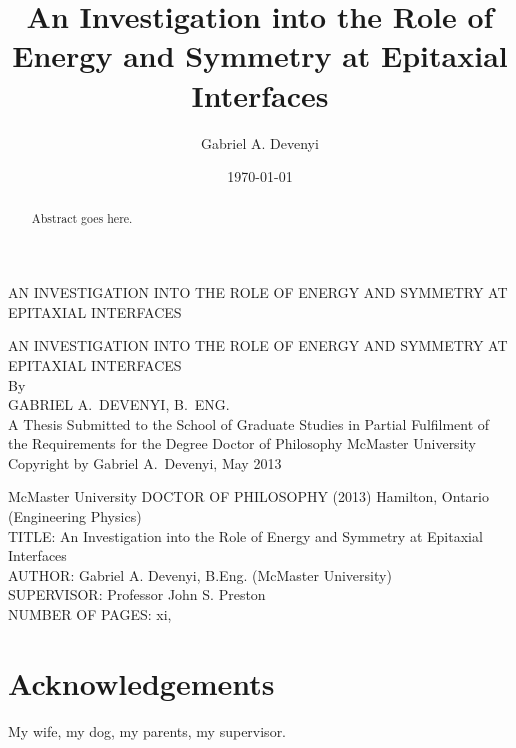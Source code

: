 \documentclass[letterpaper,12pt,twoside]{report}
\title{An Investigation into the Role of Energy and Symmetry at Epitaxial Interfaces}
\author{Gabriel A. Devenyi}
\date{\today}
\begin{document}
\begin{titlepage} %
	\vspace*{\fill}
    \begin{center}{\Large
	\uppercase{An Investigation into the Role of Energy and Symmetry at Epitaxial Interfaces}}
    \end{center}
	\vspace*{\fill}
    \setcounter{page}{0}
\end{titlepage}
\begin{titlepage} %
\centering
\vspace*{\fill} %
{\Large \uppercase{An Investigation into the Role of Energy and Symmetry at Epitaxial Interfaces}\\
By\\GABRIEL A.\ DEVENYI, B.\ ENG.\\}
\vfill
A Thesis Submitted to the School of Graduate Studies in Partial Fulfilment of 
the Requirements for the Degree Doctor of Philosophy
McMaster University
\vfill%
\textcopyright{} Copyright by Gabriel A.\ Devenyi, May 2013
\end{titlepage}
{\noindent McMaster University DOCTOR OF PHILOSOPHY (2013) Hamilton, Ontario (Engineering Physics)\\ 
TITLE: An Investigation into the Role of Energy and Symmetry at Epitaxial Interfaces\\
AUTHOR: Gabriel A. Devenyi, B.Eng. (McMaster University)\\
SUPERVISOR: Professor John S. Preston\\
NUMBER OF PAGES: xi,~\pageref{LastPage}}
	\begin{abstract}
		\thispagestyle{plain}
		\setcounter{page}{3}
			Abstract goes here.
	\end{abstract}
	\setcounter{page}{4}
	\chapter*{Acknowledgements}
	My wife, my dog, my parents, my supervisor.
	\newpage

	\tableofcontents
	\listoffigures
    \listoftodos
	\clearpage
\end{document}

